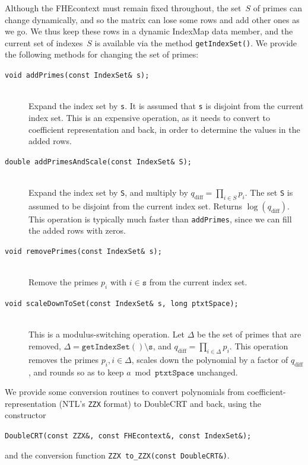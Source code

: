 \documentclass[14pt]{extarticle}
\def\IndexMap{\textsf{IndexMap}}
\def\SingleCRT{\textsf{SingleCRT}}
\def\DoubleCRT{\textsf{DoubleCRT}}
\def\FHEcontext{\textsf{FHEcontext}}
\begin{document}
Although the {\FHEcontext} must remain fixed throughout, the set~$S$
of primes can change dynamically, and so the matrix can lose some rows
and add other ones as we go. We thus keep these rows in a dynamic
{\IndexMap} data member, and the current set of indexes~$S$ is
available via the method \texttt{getIndexSet()}. We provide the
following methods for changing the set of primes:
\begin{description}
\item[\texttt{void addPrimes(const IndexSet\& s);}]\ \\
Expand the index set by \texttt{s}. It is assumed that \texttt{s} is
disjoint from the current index set. This is an expensive operation,
as it needs to convert to coefficient representation and back, in
order to determine the values in the added rows.
  
\item[\texttt{double addPrimesAndScale(const IndexSet\& S);}]\ \\
Expand the index set by \texttt{S}, and multiply by $q_{\mathrm{diff}}
=\prod_{i \in S}p_i$. The set \texttt{S} is assumed to be disjoint
from the current index set. Returns $\log(q_{\mathrm{diff}})$. This
operation is typically much faster than \texttt{addPrimes}, since we
can fill the added rows with zeros.

\item[\texttt{void removePrimes(const IndexSet\& s);}]\ \\
Remove the primes $p_i$ with $i\in\mathtt{s}$ from the current
index set.

\item[\texttt{void scaleDownToSet(const IndexSet\& s, long ptxtSpace);}]\ \\
This is a modulus-switching operation. Let $\Delta$ be the set of
primes that are removed, $\Delta=\mathtt{getIndexSet()\setminus s}$,
and  $q_{\mathrm{diff}}=\prod_{i \in \Delta}p_i$. This operation
removes the primes $p_i, i\in\Delta$, scales down the polynomial by
a factor of $q_{\mathrm{diff}}$, and rounds so as to keep $a \bmod
\mathtt{ptxtSpace}$ unchanged.
\end{description}

We provide some conversion routines to convert polynomials from
coefficient-representation (NTL's \texttt{ZZX} format) to {\DoubleCRT}
and back, using the constructor 

\smallskip
\texttt{DoubleCRT(const ZZX\&, const FHEcontext\&, const IndexSet\&);}

\smallskip\noindent
and the conversion function \texttt{ZZX to\_ZZX(const DoubleCRT\&)}.
\end{document}
